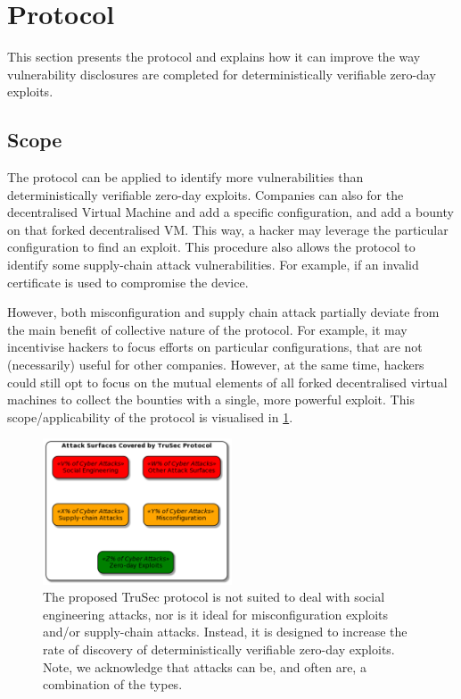 \section{Protocol}
\label{sec:protocol}
This section presents the protocol and explains how it can improve the way vulnerability disclosures are completed for deterministically verifiable zero-day exploits.

\subsection{Scope}\label{subsec:scope}
The protocol can be applied to identify more vulnerabilities than deterministically verifiable zero-day exploits. Companies can also for the decentralised Virtual Machine and add a specific configuration, and add a bounty on that forked decentralised VM. This way, a hacker may leverage the particular configuration to find an exploit. This procedure also allows the protocol to identify some supply-chain attack vulnerabilities. For example, if an invalid certificate is used to compromise the device.

However, both misconfiguration and supply chain attack partially deviate from the main benefit of collective nature of the protocol. For example, it may incentivise hackers to focus efforts on particular configurations, that are not (necessarily) useful for other companies. However, at the same time, hackers could still opt to focus on the mutual elements of all forked decentralised virtual machines to collect the bounties with a single, more powerful exploit. This scope/applicability of the protocol is visualised in \cref{fig:protocol_scope}.
\begin{figure}[H]
    \centering
    \includegraphics[width=0.50\textwidth]{images/plantuml/scope.png}
    \caption{The proposed TruSec protocol is not suited to deal with social engineering attacks, nor is it ideal for misconfiguration exploits and/or supply-chain attacks. Instead, it is designed to increase the rate of discovery of deterministically verifiable zero-day exploits. Note, we acknowledge that attacks can be, and often are, a combination of the types.}
    \label{fig:protocol_scope}
\end{figure}

